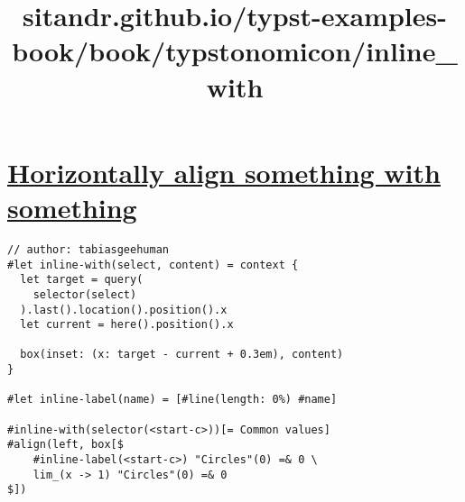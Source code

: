 \title{sitandr.github.io/typst-examples-book/book/typstonomicon/inline_with}

\section{\texorpdfstring{\hyperref[horizontally-align-something-with-something]{Horizontally
align something with
something}}{Horizontally align something with something}}\label{horizontally-align-something-with-something}

\begin{verbatim}
// author: tabiasgeehuman
#let inline-with(select, content) = context {
  let target = query(
    selector(select)
  ).last().location().position().x
  let current = here().position().x

  box(inset: (x: target - current + 0.3em), content)
}

#let inline-label(name) = [#line(length: 0%) #name]

#inline-with(selector(<start-c>))[= Common values]
#align(left, box[$
    #inline-label(<start-c>) "Circles"(0) =& 0 \
    lim_(x -> 1) "Circles"(0) =& 0
$])
\end{verbatim}

\pandocbounded{}
